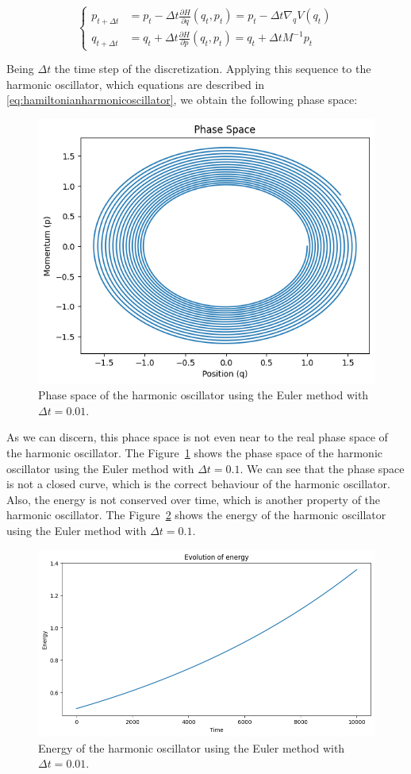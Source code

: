 \documentclass{article}
\begin{document}
\begin{equation}
	\begin{cases}
		p_{t+ \Delta t} &= p_t - \Delta t \frac{\partial H}{\partial q}(q_t, p_t) = p_t - \Delta t \nabla_q V(q_t) \\
		q_{t+ \Delta t} &= q_t + \Delta t \frac{\partial H}{\partial p}(q_t, p_t) = q_t + \Delta t M^{-1} p_t
	\end{cases}
	\label{eq:euler}
\end{equation}

Being \(\Delta t\) the time step of the discretization. Applying this sequence to the harmonic oscillator, which equations are described in \eqref{eq:hamiltonianharmonicoscillator}, we obtain the following phase space:

\begin{figure}[H]
	\centering
	\includegraphics[width=0.5\linewidth]{./Figures/Sympletic/eulerphase1.png}
	\caption{Phase space of the harmonic oscillator using the Euler method with \(\Delta t = 0.01\).}
	\label{fig:hamiltonianharmonicoscillator}
\end{figure}

As we can discern, this phace space is not even near to the real phase space of the harmonic oscillator. The Figure~\ref{fig:hamiltonianharmonicoscillator} shows the phase space of the harmonic oscillator using the Euler method with \(\Delta t = 0.1\). We can see that the phase space is not a closed curve, which is the correct behaviour of the harmonic oscillator. Also, the energy is not conserved over time, which is another property of the harmonic oscillator. The Figure~\ref{fig:hamiltonianharmonicoscillatorenergy} shows the energy of the harmonic oscillator using the Euler method with \(\Delta t = 0.1\).

\begin{figure}[H]
	\centering
	\includegraphics[width=0.5\linewidth]{./Figures/Sympletic/eulerenergy1.png}
	\caption{Energy of the harmonic oscillator using the Euler method with \(\Delta t = 0.01\).}
	\label{fig:hamiltonianharmonicoscillatorenergy}
\end{figure}
\end{document}
